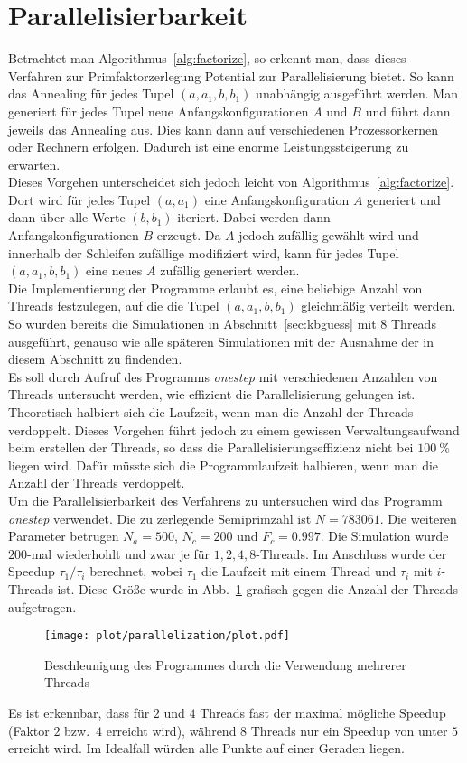 \section{Parallelisierbarkeit}\label{sec:parallel}
Betrachtet man Algorithmus~\ref{alg:factorize}, so erkennt man, dass dieses Verfahren zur Primfaktorzerlegung Potential zur Parallelisierung bietet. So kann das Annealing für jedes Tupel $\left(a,a_1,b,b_1\right)$ unabhängig ausgeführt werden. Man generiert für jedes Tupel neue Anfangskonfigurationen $A$ und $B$ und führt dann jeweils das Annealing aus. Dies kann dann auf verschiedenen Prozessorkernen oder Rechnern erfolgen. Dadurch ist eine enorme Leistungssteigerung zu erwarten.\\
Dieses Vorgehen unterscheidet sich jedoch leicht von Algorithmus~\ref{alg:factorize}. Dort wird für jedes Tupel $\left(a,a_1\right)$ eine Anfangskonfiguration $A$ generiert und dann über alle Werte $\left(b,b_1\right)$ iteriert. Dabei werden dann Anfangskonfigurationen $B$ erzeugt. Da $A$ jedoch zufällig gewählt wird und innerhalb der Schleifen zufällige modifiziert wird, kann für jedes Tupel $\left(a,a_1,b,b_1\right)$ eine neues $A$ zufällig generiert werden. \\
Die Implementierung der Programme erlaubt es, eine beliebige Anzahl von Threads festzulegen, auf die die Tupel $\left(a,a_1,b,b_1\right)$ gleichmäßig verteilt werden. So wurden bereits die Simulationen in Abschnitt~\ref{sec:kbguess} mit $8$ Threads ausgeführt, genauso wie alle späteren Simulationen mit der Ausnahme der in diesem Abschnitt zu findenden. \\
Es soll durch Aufruf des Programms \textit{onestep} mit verschiedenen Anzahlen von Threads untersucht werden, wie effizient die Parallelisierung gelungen ist. Theoretisch halbiert sich die Laufzeit, wenn man die Anzahl der Threads verdoppelt. Dieses Vorgehen führt jedoch zu einem gewissen Verwaltungsaufwand beim erstellen der Threads, so dass die Parallelisierungseffizienz nicht bei $\SI{100}{\percent}$ liegen wird. Dafür müsste sich die Programmlaufzeit halbieren, wenn man die Anzahl der Threads verdoppelt.\\
Um die Parallelisierbarkeit des Verfahrens zu untersuchen wird das Programm \textit{onestep} verwendet. Die zu zerlegende Semiprimzahl ist $N=783061$. Die weiteren Parameter betrugen $N_a=500$, $N_c=200$ und $F_c=0.997$. Die Simulation wurde $200$-mal wiederhohlt und zwar je für $1, 2, 4, 8$-Threads. Im Anschluss wurde der Speedup $\tau_1/\tau_i$ berechnet, wobei $\tau_1$ die Laufzeit mit einem Thread und $\tau_i$ mit $i$-Threads ist. Diese Größe wurde in Abb.~\ref{fig:speedup} grafisch gegen die Anzahl der Threads aufgetragen.\\
\begin{figure}[ht]
		\centering
		\texttt{[image: plot/parallelization/plot.pdf]}
		\caption{Beschleunigung des Programmes durch die Verwendung mehrerer Threads}\label{fig:speedup}
\end{figure}
Es ist erkennbar, dass für $2$ und $4$ Threads fast der maximal mögliche Speedup (Faktor $2$ bzw.\ $4$ erreicht wird), während $8$ Threads nur ein Speedup von unter $5$ erreicht wird. Im Idealfall würden alle Punkte auf einer Geraden liegen.

